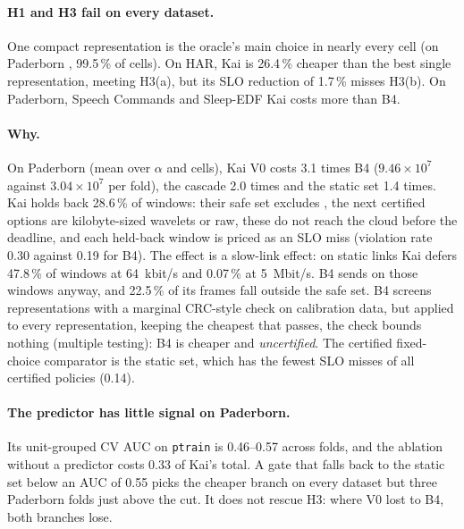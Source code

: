 \paragraph{H1 and H3 fail on every dataset.} One compact representation is the oracle's main
choice in nearly every cell (on Paderborn , 99.5\,\% of cells). On HAR, Kai is 26.4\,\%
cheaper than the best single representation, meeting H3(a), but its SLO reduction of 1.7\,\% misses
H3(b). On Paderborn, Speech Commands and Sleep-EDF Kai costs more than B4.

\paragraph{Why.} On Paderborn (mean over $\alpha$ and cells), Kai V0 costs 3.1 times B4
($9.46\times10^7$ against $3.04\times10^7$ per fold), the cascade 2.0 times and the static set 1.4
times. Kai holds back 28.6\,\% of windows: their safe set excludes , the next certified
options are kilobyte-sized wavelets or raw, these do not reach the cloud before the deadline, and
each held-back window is priced as an SLO miss (violation rate 0.30 against 0.19 for B4). The
effect is a slow-link effect: on static links Kai defers 47.8\,\% of windows at 64~kbit/s and
0.07\,\% at 5~Mbit/s. B4 sends  on those windows anyway, and 22.5\,\% of its frames fall
outside the safe set. B4 screens representations with a marginal CRC-style check on calibration
data, but applied to every representation, keeping the cheapest that passes, the check bounds
nothing (multiple testing): B4 is cheaper and \emph{uncertified}. The certified fixed-choice
comparator is the static set, which has the fewest SLO misses of all certified policies (0.14).

\paragraph{The predictor has little signal on Paderborn.} Its unit-grouped CV AUC on
\texttt{ptrain} is 0.46--0.57 across folds, and the ablation without a predictor costs 0.33 of
Kai's total. A gate that falls back to the static set below an AUC of 0.55\expl{} picks the cheaper
branch on every dataset but three Paderborn folds just above the cut. It does not rescue H3:
where V0 lost to B4, both branches lose.

